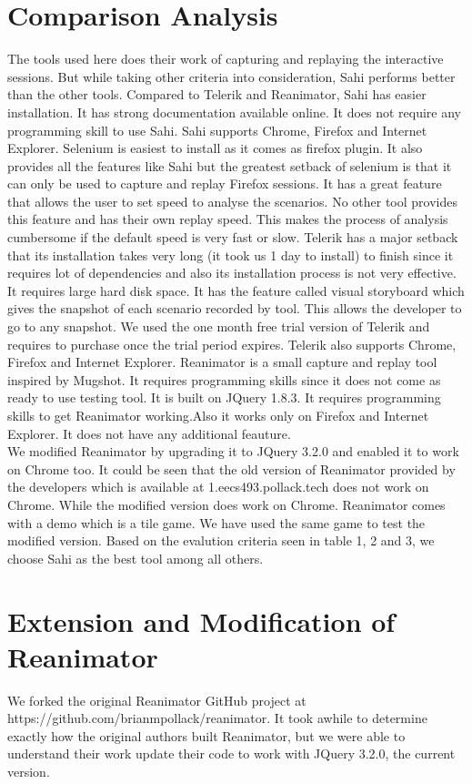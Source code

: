 \documentclass[12pt,journal]{IEEEtran}
\begin{document}
\section{Comparison Analysis}
The tools used here does their work of capturing and replaying the interactive sessions. But while taking other criteria into consideration, Sahi performs better than the other tools. Compared to Telerik and Reanimator, Sahi has easier installation. It has strong documentation available online. It does not require any programming skill to use Sahi. Sahi supports Chrome, Firefox and Internet Explorer. Selenium is easiest to install as it comes as firefox plugin. It also provides all the features like Sahi but the greatest setback of selenium is that it can only be used to capture and replay Firefox sessions. It has a great feature that allows the user to set speed to analyse the scenarios. No other tool provides this feature and has their own replay speed. This makes the process of analysis cumbersome if the default speed is very fast or slow. Telerik has a major setback that its installation takes very long (it took us 1 day to install) to finish since it requires lot of dependencies and also its installation process is not very effective. It requires large hard disk space. It has the feature called visual storyboard which gives the snapshot of each scenario recorded by tool. This allows the developer to go to any snapshot. We used the one month free trial version of Telerik and requires to purchase once the trial period expires. Telerik also supports Chrome, Firefox and Internet Explorer. Reanimator is a small capture and replay tool inspired by Mugshot. It requires programming skills since it does not come as ready to use testing tool. It is built on JQuery 1.8.3. It requires programming skills to get Reanimator working.Also it works only on Firefox and Internet Explorer. It does not have any additional feauture. \\
We modified Reanimator by upgrading it to JQuery 3.2.0 and enabled it to work on Chrome too. It could be seen that the old version of Reanimator provided by the developers which is available at 1.eecs493.pollack.tech does not work on Chrome. While the modified version does work on Chrome. Reanimator comes with a demo which is a tile game. We have used the same game to test the modified version.
 Based on the evalution criteria seen in table 1, 2 and 3, we choose Sahi as the best tool among all others.


\section{Extension and Modification of Reanimator}
We forked the original Reanimator GitHub project at https://github.com/brianmpollack/reanimator. It took awhile to determine exactly how the original authors built Reanimator, but we were able to understand their work update their code to work with JQuery 3.2.0, the current version.
\end{document}
